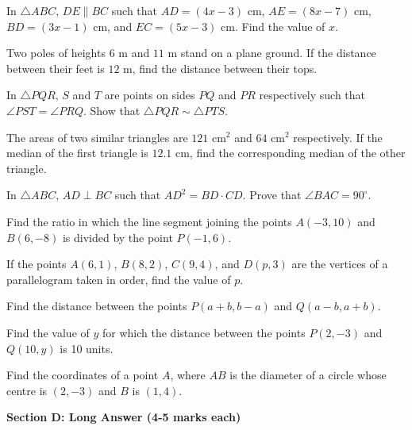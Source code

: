\documentclass[12pt,a4paper]{exam}
\begin{document}
\begin{questions}
\question[3] In $\triangle ABC$, $DE \parallel BC$ such that $AD = (4x - 3)$ cm, $AE = (8x - 7)$ cm, $BD = (3x - 1)$ cm, and $EC = (5x - 3)$ cm. Find the value of $x$.
\vspace{0.15cm}

\question[3] Two poles of heights $6$ m and $11$ m stand on a plane ground. If the distance between their feet is $12$ m, find the distance between their tops.
\vspace{0.15cm}

\question[3] In $\triangle PQR$, $S$ and $T$ are points on sides $PQ$ and $PR$ respectively such that $\angle PST = \angle PRQ$. Show that $\triangle PQR \sim \triangle PTS$.
\vspace{0.15cm}

\question[3] The areas of two similar triangles are $121$ cm$^2$ and $64$ cm$^2$ respectively. If the median of the first triangle is $12.1$ cm, find the corresponding median of the other triangle.
\vspace{0.15cm}

\question[3] In $\triangle ABC$, $AD \perp BC$ such that $AD^2 = BD \cdot CD$. Prove that $\angle BAC = 90^\circ$.
\vspace{0.15cm}

\question[3] Find the ratio in which the line segment joining the points $A(-3, 10)$ and $B(6, -8)$ is divided by the point $P(-1, 6)$.
\vspace{0.15cm}

\question[3] If the points $A(6, 1)$, $B(8, 2)$, $C(9, 4)$, and $D(p, 3)$ are the vertices of a parallelogram taken in order, find the value of $p$.
\vspace{0.15cm}

\question[3] Find the distance between the points $P(a+b, b-a)$ and $Q(a-b, a+b)$.
\vspace{0.15cm}

\question[3] Find the value of $y$ for which the distance between the points $P(2, -3)$ and $Q(10, y)$ is 10 units.
\vspace{0.15cm}

\question[3] Find the coordinates of a point $A$, where $AB$ is the diameter of a circle whose centre is $(2, -3)$ and $B$ is $(1, 4)$.
\vspace{0.15cm}

\end{questions}
\bigskip
\noindent\textbf{\large Section D: Long Answer (4-5 marks each)}
\end{document}
